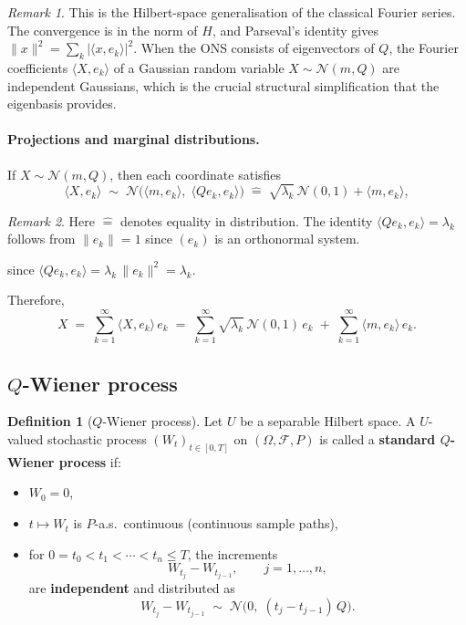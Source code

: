 \documentclass[11pt]{article}
\theoremstyle{definition}
\newtheorem{definition}{Definition}
\theoremstyle{remark}
\newtheorem{remark}{Remark}
\begin{document}
\begin{remark}
This is the Hilbert-space generalisation of the classical Fourier series.  The convergence is in the norm of $H$, and Parseval's identity gives $\|x\|^2 = \sum_k |\langle x, e_k\rangle|^2$.  When the ONS consists of eigenvectors of $Q$, the Fourier coefficients $\langle X, e_k\rangle$ of a Gaussian random variable $X \sim \mathcal{N}(m,Q)$ are independent Gaussians, which is the crucial structural simplification that the eigenbasis provides.
\end{remark}

\paragraph{Projections and marginal distributions.}
If $X \sim \mathcal{N}(m, Q)$, then each coordinate satisfies
\[
    \langle X, e_k \rangle
    \;\sim\;
    \mathcal{N}\!\bigl(\langle m, e_k \rangle,\;
    \langle Q e_k, e_k \rangle\bigr)
    \;\hat{=}\;
    \sqrt{\lambda_k}\,\mathcal{N}(0,1) + \langle m, e_k \rangle,
\]
\begin{remark}
Here $\hat{=}$ denotes equality in distribution. The identity $\langle Q e_k, e_k \rangle = \lambda_k$ follows from $\|e_k\| = 1$ since $(e_k)$ is an orthonormal system.
\end{remark}
since $\langle Q e_k, e_k \rangle = \lambda_k\,\|e_k\|^2 = \lambda_k$.

Therefore,
\[
    X \;=\; \sum_{k=1}^{\infty} \langle X, e_k \rangle\,e_k
    \;=\;
    \sum_{k=1}^{\infty} \sqrt{\lambda_k}\,\mathcal{N}(0,1)\,e_k
    \;+\; \sum_{k=1}^{\infty} \langle m, e_k \rangle\,e_k.
\]

\subsection*{$Q$-Wiener process}



\begin{definition}[$Q$-Wiener process]
Let $U$ be a separable Hilbert space. A $U$-valued stochastic process $(W_t)_{t \in [0,T]}$ on $(\Omega, \mathcal{F}, P)$
is called a \textbf{standard $Q$-Wiener process} if:
\begin{itemize}
    \item[(i)] $W_0 = 0$,
    \item[(ii)] $t \mapsto W_t$ is $P$-a.s.\ continuous
          \quad (continuous sample paths),
    \item[(iii)] for $0 = t_0 < t_1 < \cdots < t_n \le T$,
          the increments
          \[
              W_{t_j} - W_{t_{j-1}}, \qquad j = 1, \ldots, n,
          \]
          are \textbf{independent} and distributed as
          \[
              W_{t_j} - W_{t_{j-1}}
              \;\sim\;
              \mathcal{N}\!\bigl(0,\;(t_j - t_{j-1})\,Q\bigr).
          \]
\end{itemize}
\end{definition}
\end{document}

